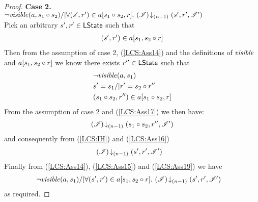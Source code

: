 \begin{lemma}
\begin{proof}
\noindent\textbf{Case 2.} \\
$
	\neg\mathit{visible}(a,s_1 \circ s_2) /| \forall (s', r') \in a[s_1 \circ s_2, r].\,  \left(\mathscr{I}\right) \!\downarrow_{(n-1)} \left(s', r', \mathscr{I}'\right)
$\\
%
Pick an arbitrary $s', r' \in \textsf{LState}$ such that
\begin{align}
	(s', r') \in a[s_1, s_2 \circ r]
	\label{LCS:Ass14}
\end{align}
%
Then from the assumption of case 2, (\ref{LCS:Ass14}) and the definitions of $\mathit{visible}$ and $a[s_1, s_2 \circ r]$ we know there exists $r'' \in \textsf{LState}$ such that
%
\begin{align}
	& \neg\mathit{visible}(a, s_1) \label{LCS:Ass15}\\
	& s' = s_1 /| r' = s_2 \circ r'' \label{LCS:Ass16}\\
	& (s_1 \circ s_2, r'') \in a[s_1 \circ s_2, r] \label{LCS:Ass17} 
\end{align}
%
From the assumption of case 2 and (\ref{LCS:Ass17}) we then have:
%
\begin{align}
	\left(\mathscr{I}\right) \!\downarrow_{(n-1)} \left(s_1 \circ s_2, r'', \mathscr{I}'\right)
	\label{LCS:Ass18}
\end{align}
%
and consequently from (\ref{LCS:IH}) and (\ref{LCS:Ass16})
%
\begin{align}
  & \left(\mathscr{I}\right) \!\downarrow_{(n-1)} \left(s', r', \mathscr{I}'\right)  \label{LCS:Ass19}
\end{align}
%
Finally from (\ref{LCS:Ass14}), (\ref{LCS:Ass15}) and (\ref{LCS:Ass19}) we have
%
\begin{align*}
  &\neg\mathit{visible}(a,s_1) /| \forall (s', r') \in a[s_1, s_2 \circ r].\, \left(\mathscr{I}\right) \!\downarrow_{(n-1)} \left(s', r', \mathscr{I}'\right)  \nonumber
\end{align*}
%
as required.
%
\end{proof}
\end{lemma}
%
%